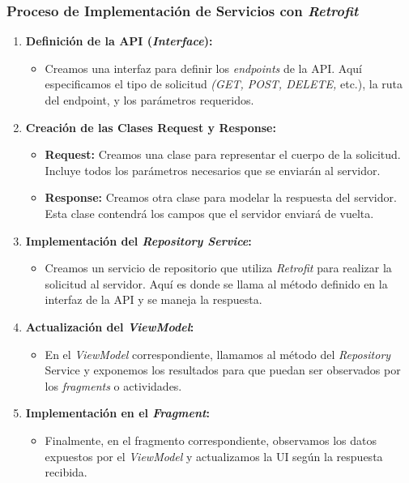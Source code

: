 \subsubsection{Proceso de Implementación de Servicios con \textit{Retrofit}}

\begin{enumerate}
    \item \textbf{Definición de la API (\textit{Interface}):}
    
    \begin{itemize}
        \item Creamos una interfaz para definir los \textit{endpoints} de la API. Aquí especificamos el tipo de solicitud \textit{(GET, POST, DELETE,} etc.), la ruta del endpoint, y los parámetros requeridos.
    \end{itemize}

    \item \textbf{Creación de las Clases Request y Response:}
    \begin{itemize}
        \item \textbf{Request:} Creamos una clase para representar el cuerpo de la solicitud. Incluye todos los parámetros necesarios que se enviarán al servidor.
        \item \textbf{Response:} Creamos otra clase para modelar la respuesta del servidor. Esta clase contendrá los campos que el servidor enviará de vuelta.

    \end{itemize}

    \item \textbf{Implementación del \textit{Repository Service}:}
    \begin{itemize}
        \item Creamos un servicio de repositorio que utiliza \textit{Retrofit} para realizar la solicitud al servidor. Aquí es donde se llama al método definido en la interfaz de la API y se maneja la respuesta.

    \end{itemize}

    \item \textbf{Actualización del \textit{ViewModel}:}
    \begin{itemize}
        \item En el \textit{ViewModel} correspondiente, llamamos al método del \textit{Repository} Service y exponemos los resultados para que puedan ser observados por los \textit{fragments} o actividades.

    \end{itemize}

    \item \textbf{Implementación en el \textit{Fragment}:}
    \begin{itemize}
        \item Finalmente, en el fragmento correspondiente, observamos los datos expuestos por el \textit{ViewModel} y actualizamos la UI según la respuesta recibida.

    \end{itemize}
\end{enumerate}

